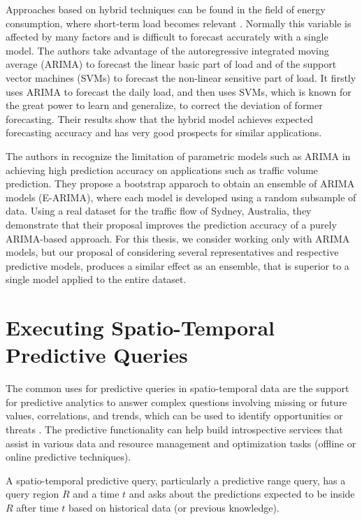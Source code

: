 Approaches based on hybrid techniques can be found in the field of energy consumption, where short-term  load becomes relevant \cite{Nie2012}. Normally this variable is affected by many factors and is difficult to forecast accurately with a single model. The authors take advantage of the autoregressive integrated moving average (ARIMA) to forecast the linear basic part of load and of the support vector machines (SVMs) to forecast the non-linear sensitive part of load. It firstly uses ARIMA to forecast the daily load, and then uses SVMs,  which  is  known  for  the  great  power  to  learn  and  generalize,  to  correct  the  deviation  of  former  forecasting. Their results show that the hybrid model achieves expected forecasting  accuracy and has very good prospects for similar applications.

The authors in \cite{Shahriari2020} recognize the limitation of parametric models such as ARIMA in achieving high prediction accuracy on applications such as traffic volume prediction. They propose a bootstrap apparoch to obtain an ensemble of ARIMA models (E-ARIMA), where each model is developed using a random subsample of data. Using a real dataset for the traffic flow of Sydney, Australia, they demonstrate that their proposal improves the prediction accuracy of a purely ARIMA-based approach. For this thesis, we consider working only with ARIMA models, but our proposal of considering several representatives and respective predictive models, produces a similar effect as an ensemble, that is superior to a single model applied to the entire dataset.

\section{Executing Spatio-Temporal Predictive Queries}
\label{Sec:RelatedWorksQueries}

The common uses for predictive queries in spatio-temporal data are the support for predictive analytics to answer complex questions involving missing or future values, correlations, and trends, which can be used to identify opportunities or threats \cite{}. The predictive functionality can help build introspective services that assist in various data and resource management and optimization tasks (offline or online predictive techniques).

A spatio-temporal predictive query, particularly a predictive range query, has a query region $R$ and a time $t$ and asks about the predictions expected to be inside $R$ after time $t$ based on historical data (or previous knowledge). 

